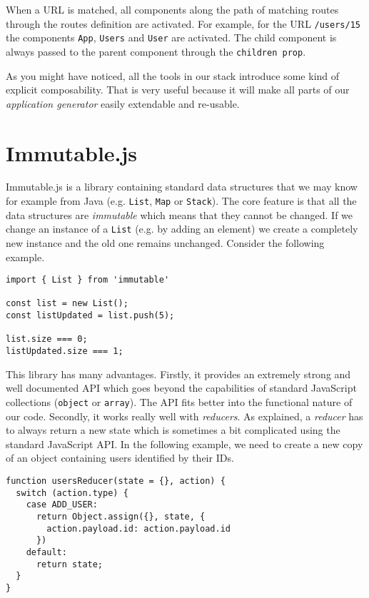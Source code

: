 When a URL is matched, all components along the path of matching routes through the routes definition are activated. For example, for the URL \texttt{/users/15} the components \texttt{App}, \texttt{Users} and \texttt{User} are activated. The child component is always passed to the parent component through the \texttt{children prop}. 

As you might have noticed, all the tools in our stack introduce some kind of explicit composability. That is very useful because it will make all parts of our  \emph{application generator} easily extendable and re-usable.

\section{Immutable.js}

Immutable.js \cite{immutable} is a library containing  standard data structures that we may know for example from Java (e.g. \texttt{List}, \texttt{Map} or \texttt{Stack}). The core feature is that all the data structures are \emph{immutable} which means that they cannot be changed. If we change an instance of a \texttt{List} (e.g. by adding an element) we create a completely new instance and the old one remains unchanged. Consider the following example.

\begin{verbatim}
import { List } from 'immutable'

const list = new List();
const listUpdated = list.push(5);

list.size === 0;
listUpdated.size === 1;
\end{verbatim}

This library has many advantages. Firstly, it provides an extremely strong and well documented API which goes beyond the capabilities of standard JavaScript collections (\texttt{object} or \texttt{array}). The API fits better into the functional nature of our code. Secondly, it works really well with \emph{reducers}. As explained, a \emph{reducer} has to always return a new state which is sometimes a bit complicated using the standard JavaScript API. In the following example, we need to create a new copy of an object containing users identified by their IDs.

\begin{verbatim}
function usersReducer(state = {}, action) {
  switch (action.type) {
    case ADD_USER: 
      return Object.assign({}, state, {
        action.payload.id: action.payload.id
      })
    default:
      return state;
  }
}
\end{verbatim}

